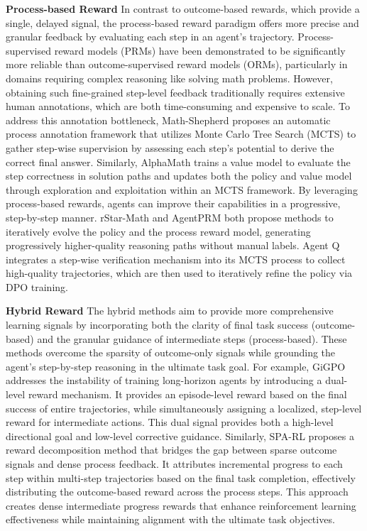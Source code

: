 \documentclass[10pt]{article} %
\begin{document}
      
\textbf{Process-based Reward}
In contrast to outcome-based rewards, which provide a single, delayed signal, the process-based reward paradigm offers more precise and granular feedback by evaluating each step in an agent’s trajectory.
Process-supervised reward models (PRMs) have been demonstrated to be significantly more reliable than outcome-supervised reward models (ORMs), particularly in domains requiring complex reasoning like solving math problems\citep{lightman2023let}.
However, obtaining such fine-grained step-level feedback traditionally requires extensive human annotations, which are both time-consuming and expensive to scale.
To address this annotation bottleneck, Math-Shepherd\citep{wang2023math} proposes an automatic process annotation framework that utilizes Monte Carlo Tree Search (MCTS) to gather step-wise supervision by assessing each step’s potential to derive the correct final answer. Similarly, AlphaMath\citep{chen2024alphamath} trains a value model to evaluate the step correctness in solution paths and updates both the policy and value model through exploration and exploitation within an MCTS framework.
By leveraging process-based rewards, agents can improve their capabilities in a progressive, step-by-step manner.
rStar-Math\citep{guan2025rstar} and AgentPRM\citep{choudhury2025process} both propose methods to iteratively evolve the policy and the process reward model, generating progressively higher-quality reasoning paths without manual labels. Agent Q\citep{putta2024agentq} integrates a step-wise verification mechanism into its MCTS process to collect high-quality trajectories, which are then used to iteratively refine the policy via DPO training. 

\textbf{Hybrid Reward}
The hybrid methods aim to provide more comprehensive learning signals by incorporating both the clarity of final task success (outcome-based) and the granular guidance of intermediate steps (process-based). These methods overcome the sparsity of outcome-only signals while grounding the agent’s step-by-step reasoning in the ultimate task goal.
For example, GiGPO\citep{feng2025group} addresses the instability of training long-horizon agents by introducing a dual-level reward mechanism. It provides an episode-level reward based on the final success of entire trajectories, while simultaneously assigning a localized, step-level reward for intermediate actions. This dual signal provides both a high-level directional goal and low-level corrective guidance.
Similarly, SPA-RL\citep{wang2025spa} proposes a reward decomposition method that bridges the gap between sparse outcome signals and dense process feedback. It attributes incremental progress to each step within multi-step trajectories based on the final task completion, effectively distributing the outcome-based reward across the process steps. This approach creates dense intermediate progress rewards that enhance reinforcement learning effectiveness while maintaining alignment with the ultimate task objectives.
\end{document}

